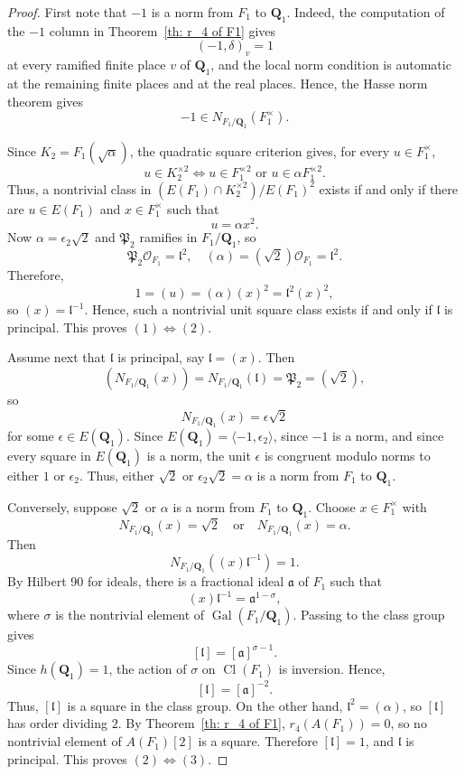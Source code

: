 \documentclass{article}
\numberwithin{equation}{section}
\theoremstyle{plain}  %
\theoremstyle{definition}
\newcommand{\fk}{\mathfrak }
\begin{document}
\begin{proof}
First note that $-1$ is a norm from $F_1$ to $\mathbf Q_1$. Indeed, the computation of the $-1$ column in Theorem~\ref{th: r_4 of F1} gives
$$
(-1,\delta)_v=1
$$
at every ramified finite place $v$ of $\mathbf Q_1$, and the local norm condition is automatic at the remaining finite places and at the real places. Hence, the Hasse norm theorem gives
$$
-1 \in N_{F_1/\mathbf Q_1}(F_1^\times).
$$

Since $K_2=F_1(\sqrt \alpha)$, the quadratic square criterion gives, for every $u \in F_1^\times$,
$$
u \in K_2^{\times 2} \iff u \in F_1^{\times 2} \text{ or } u \in \alpha F_1^{\times 2}.
$$
Thus, a nontrivial class in $(E(F_1) \cap K_2^{\times 2})/E(F_1)^2$ exists if and only if there are $u \in E(F_1)$ and $x \in F_1^\times$ such that
$$
u=\alpha x^2.
$$
Now $\alpha=\epsilon_2\sqrt 2$ and $\fk P_2$ ramifies in $F_1/\mathbf Q_1$, so
$$
\fk P_2\mathcal O_{F_1}=\fk l^2, \quad (\alpha)=(\sqrt 2)\mathcal O_{F_1}=\fk l^2.
$$
Therefore,
$$
1=(u)=(\alpha)(x)^2=\fk l^2(x)^2,
$$
so $(x)=\fk l^{-1}$. Hence, such a nontrivial unit square class exists if and only if $\fk l$ is principal. This proves $(1) \Longleftrightarrow (2)$.

Assume next that $\fk l$ is principal, say $\fk l=(x)$. Then
$$
(N_{F_1/\mathbf Q_1}(x))=N_{F_1/\mathbf Q_1}(\fk l)=\fk P_2=(\sqrt 2),
$$
so
$$
N_{F_1/\mathbf Q_1}(x)=\epsilon\sqrt 2
$$
for some $\epsilon \in E(\mathbf Q_1)$. Since $E(\mathbf Q_1)=\langle -1,\epsilon_2\rangle$, since $-1$ is a norm, and since every square in $E(\mathbf Q_1)$ is a norm, the unit $\epsilon$ is congruent modulo norms to either $1$ or $\epsilon_2$. Thus, either $\sqrt 2$ or $\epsilon_2\sqrt 2=\alpha$ is a norm from $F_1$ to $\mathbf Q_1$.

Conversely, suppose $\sqrt 2$ or $\alpha$ is a norm from $F_1$ to $\mathbf Q_1$. Choose $x \in F_1^\times$ with
$$
N_{F_1/\mathbf Q_1}(x)=\sqrt 2 \quad \text{or} \quad N_{F_1/\mathbf Q_1}(x)=\alpha.
$$
Then
$$
N_{F_1/\mathbf Q_1}((x)\fk l^{-1})=1.
$$
By Hilbert 90 for ideals, there is a fractional ideal $\fk a$ of $F_1$ such that
$$
(x)\fk l^{-1}=\fk a^{1-\sigma},
$$
where $\sigma$ is the nontrivial element of $\operatorname{Gal}(F_1/\mathbf Q_1)$. Passing to the class group gives
$$
[\fk l]=[\fk a]^{\sigma-1}.
$$
Since $h(\mathbf Q_1)=1$, the action of $\sigma$ on $\operatorname{Cl}(F_1)$ is inversion. Hence,
$$
[\fk l]=[\fk a]^{-2}.
$$
Thus, $[\fk l]$ is a square in the class group. On the other hand, $\fk l^2=(\alpha)$, so $[\fk l]$ has order dividing $2$. By Theorem~\ref{th: r_4 of F1}, $r_4(A(F_1))=0$, so no nontrivial element of $A(F_1)[2]$ is a square. Therefore $[\fk l]=1$, and $\fk l$ is principal. This proves $(2) \Longleftrightarrow (3)$.


\end{proof}
\end{document}
